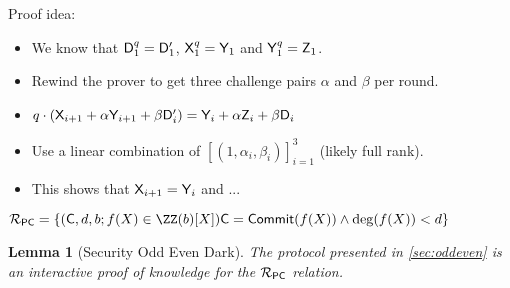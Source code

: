 \documentclass[12pt]{article}
\theoremstyle{Definition}
\newtheorem{lemma}{Lemma}
\begin{document}
	Proof idea:
	\begin{itemize}
		\item  We know that $\mathsf{D}_1^q=\mathsf{D}_1'$, $\mathsf{X}_1^q=\mathsf{Y}_1$ and $\mathsf{Y}_1^q=\mathsf{Z}_1$.
		\item Rewind the prover to get three challenge pairs $\alpha$ and $\beta$ per round.
		\item $q\cdot (\mathsf{X}_{i+1} +\alpha \mathsf{Y}_{i+1} +\beta \mathsf{D}_{i}')= \mathsf{Y}_{i} +\alpha \mathsf{Z}_{i} +\beta \mathsf{D}_{i}$
		\item Use a linear combination of $[(1,\alpha_i,\beta_i)]_{i=1}^3$ (likely full rank). 
		\item This shows that $\mathsf{X}_{i+1}= \mathsf{Y}_{i}$ and ...
	\end{itemize}
	$\Relation_\PC=\{ (\Commitment,d,b; f(X) \in \ZZ(b)[X]) \Commitment=\commit(f(X)) \wedge \deg(f(X))<d \} $
\begin{lemma}[Security Odd Even Dark]
	The protocol presented in \cref{sec:oddeven} is an interactive proof of knowledge for the $\mathcal{R}_{\mathsf{PC}}$ relation.
\end{lemma}
\end{document}
